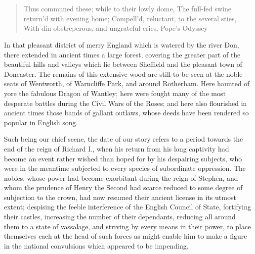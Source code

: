 \chapter{}

\begin{quote}
Thus communed these; while to their lowly dome,
The full-fed swine return'd with evening home;
Compell'd, reluctant, to the several sties,
With din obstreperous, and ungrateful cries.
Pope's Odyssey
\end{quote}

In that pleasant district of merry England which is watered by the river
Don, there extended in ancient times a large forest, covering the
greater part of the beautiful hills and valleys which lie between
Sheffield and the pleasant town of Doncaster. The remains of this
extensive wood are still to be seen at the noble seats of Wentworth, of
Warncliffe Park, and around Rotherham. Here haunted of yore the fabulous
Dragon of Wantley; here were fought many of the most desperate battles
during the Civil Wars of the Roses; and here also flourished in ancient
times those bands of gallant outlaws, whose deeds have been rendered so
popular in English song.

Such being our chief scene, the date of our story refers to a period
towards the end of the reign of Richard I., when his return from his
long captivity had become an event rather wished than hoped for by his
despairing subjects, who were in the meantime subjected to every species
of subordinate oppression. The nobles, whose power had become exorbitant
during the reign of Stephen, and whom the prudence of Henry the Second
had scarce reduced to some degree of subjection to the crown, had now
resumed their ancient license in its utmost extent; despising the feeble
interference of the English Council of State, fortifying their castles,
increasing the number of their dependants, reducing all around them to a
state of vassalage, and striving by every means in their power, to place
themselves each at the head of such forces as might enable him to make a
figure in the national convulsions which appeared to be impending.


